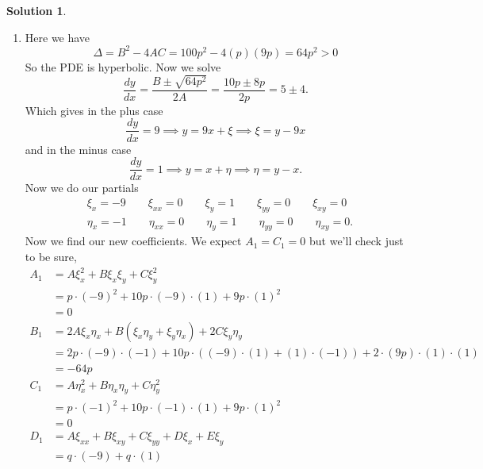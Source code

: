 \documentclass[10pt]{article}
\theoremstyle{definition}
\newtheorem{soln}{Solution}
\begin{document}
\begin{soln}~
  \begin{enumerate}[label=(\alph*)]
    \item Here we have
          $$\Delta = B^2-4AC=100p^2-4(p)(9p)=64p^2>0$$
          So the PDE is hyperbolic. Now we solve
          $$\frac{dy}{dx}=\frac{B\pm\sqrt{64p^2}}{2A}=\frac{10p\pm8p}{2p}=5\pm4.$$
          Which gives in the plus case
          $$\frac{dy}{dx}=9\implies y=9x+\xi\implies \xi=y-9x$$
          and in the minus case
          $$\frac{dy}{dx}=1\implies y=x+\eta\implies \eta=y-x.$$
          Now we do our partials
          \begin{align*}
             & \xi_x = -9 \qquad \xi_{xx}=0 \qquad \xi_y=1 \qquad \xi_{yy}=0 \qquad \xi_{xy}=0       \\
             & \eta_x = -1 \qquad \eta_{xx}=0 \qquad \eta_y=1 \qquad \eta_{yy}=0 \qquad \eta_{xy}=0.
          \end{align*}
          Now we find our new coefficients. We expect $A_1=C_1=0$ but we'll check just to be sure,
          \begin{align*}
            A_1 & =A\xi_x^2+B\xi_x\xi_y+C\xi_y^2                                     \\
                & =p\cdot(-9)^2+10p\cdot(-9)\cdot(1)+9p\cdot(1)^2                    \\
                & =0                                                                 \\
            B_1 & =2A\xi_x\eta_x+B\left(\xi_x\eta_y+\xi_y\eta_x\right)+2C\xi_y\eta_y \\
                & =2p\cdot(-9)\cdot(-1)+10p\cdot
            \left((-9)\cdot(1)+(1)\cdot(-1)\right)+2\cdot(9p)\cdot(1)\cdot(1)        \\
                & = -64p                                                             \\
            C_1 & =A\eta_x^2+B\eta_x\eta_y+C\eta_y^2                                 \\
                & =p\cdot(-1)^2+10p\cdot(-1)\cdot(1)+9p\cdot(1)^2                    \\
                & =0                                                                 \\
            D_1 & =A\xi_{xx}+B\xi_{xy}+C\xi_{yy}+D\xi_{x}+E\xi_{y}                   \\
                & =q\cdot(-9)+q\cdot(1)                                              \\

\end{align*}
\end{enumerate}
\end{soln}
\end{document}
